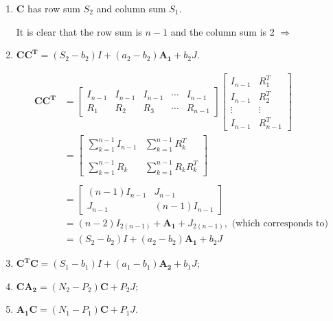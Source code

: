 \documentclass{article}
\begin{document}
\begin{enumerate}
    \item \(\mathbf{C}\) has row sum \(S_2\) and column sum \(S_1\).
    
    It is clear that the row sum is \(n-1\) and the column sum is 2 \(\Rightarrow \) 
    \item \(\mathbf{CC^T} = (S_2-b_2)I + (a_2 - b_2)\mathbf{A_1} +b_2J\).

    \begin{align*}
        \mathbf{CC^T} &=
        \begin{bmatrix}
            I_{n-1} & I_{n-1} & I_{n-1} & \cdots & I_{n-1} \\
            R_1 & R_2 & R_3 & \cdots & R_{n-1}
        \end{bmatrix} 
        \begin{bmatrix}
            I_{n-1} & R_1^T \\
            I_{n-1} & R_2^T \\
            \vdots & \vdots \\
            I_{n-1} & R_{n-1}^T
        \end{bmatrix} \\
        &= 
        \begin{bmatrix}
            \sum^{n-1}_{k=1}I_{n-1} & \sum_{k=1}^{n-1} R_k^T \\ \\
            \sum^{n-1}_{k=1}R_k & \sum_{k=1}^{n-1}R_kR_k^T
        \end{bmatrix}\\ \\
        &=
        \begin{bmatrix}
            (n-1)I_{n-1} & J_{n-1} \\
            J_{n-1} & (n-1)I_{n-1}
        \end{bmatrix}\\
        &= (n-2)I_{2(n-1)} + \mathbf{A_1} + J_{2(n-1)}, \text{ (which corresponds to)}\\
        &= (S_2-b_2)I + (a_2-b_2)\mathbf{A_1} + b_2J
    \end{align*}
    \item \(\mathbf{C^T C} = (S_1-b_1)I + (a_1-b_1)\mathbf{A_2}+b_1J\);
    \item \(\mathbf{CA_2} = (N_2-P_2)\mathbf{C}+P_2J\);
    \item \(\mathbf{A_1C} = (N_1-P_1)\mathbf{C}+P_1J\).
\end{enumerate}
\end{document}
